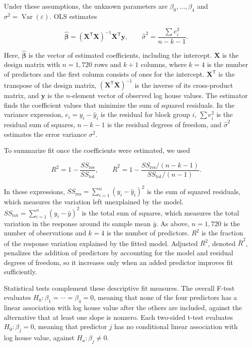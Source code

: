 \documentclass[11pt]{article}
\begin{document}
Under these assumptions, the unknown parameters are $\beta_0,\ldots,\beta_4$ and $\sigma^2=\operatorname{Var}(\varepsilon)$. OLS estimates

\begin{equation}
\widehat{\boldsymbol{\beta}}=(\mathbf{X}^{\mathsf T}\mathbf{X})^{-1}\mathbf{X}^{\mathsf T}\mathbf{y},
\qquad
\widehat{\sigma}^2=\frac{\sum e_i^2}{n-k-1}.
\end{equation}

Here, $\widehat{\boldsymbol{\beta}}$ is the vector of estimated coefficients, including the intercept. $\mathbf{X}$ is the design matrix with $n=1{,}720$ rows and $k+1$ columns, where $k=4$ is the number of predictors and the first column consists of ones for the intercept. $\mathbf{X}^{\mathsf T}$ is the transpose of the design matrix, $(\mathbf{X}^{\mathsf T}\mathbf{X})^{-1}$ is the inverse of its cross-product matrix, and $\mathbf{y}$ is the $n$-element vector of observed log house values. The estimator finds the coefficient values that minimize the sum of squared residuals. In the variance expression, $e_i=y_i-\widehat{y}_i$ is the residual for block group $i$, $\sum e_i^2$ is the residual sum of squares, $n-k-1$ is the residual degrees of freedom, and $\widehat{\sigma}^2$ estimates the error variance $\sigma^2$.

To summarize fit once the coefficients were estimated, we used

\begin{equation}
R^2=1-\frac{SS_{\mathrm{res}}}{SS_{\mathrm{tot}}},
\qquad
\bar{R}^2=1-\frac{SS_{\mathrm{res}}/(n-k-1)}{SS_{\mathrm{tot}}/(n-1)}.
\end{equation}

In these expressions, $SS_{\mathrm{res}}=\sum_{i=1}^{n}(y_i-\widehat{y}_i)^2$ is the sum of squared residuals, which measures the variation left unexplained by the model. $SS_{\mathrm{tot}}=\sum_{i=1}^{n}(y_i-\bar{y})^2$ is the total sum of squares, which measures the total variation in the response around its sample mean $\bar{y}$. As above, $n=1{,}720$ is the number of observations and $k=4$ is the number of predictors. $R^2$ is the fraction of the response variation explained by the fitted model. Adjusted $R^2$, denoted $\bar{R}^2$, penalizes the addition of predictors by accounting for the model and residual degrees of freedom, so it increases only when an added predictor improves fit sufficiently.

Statistical tests complement these descriptive fit measures. The overall F-test evaluates $H_0:\beta_1=\cdots=\beta_4=0$, meaning that none of the four predictors has a linear association with log house value after the others are included, against the alternative that at least one slope is nonzero. Each two-sided t-test evaluates $H_0:\beta_j=0$, meaning that predictor $j$ has no conditional linear association with log house value, against $H_a:\beta_j\ne0$.
\end{document}
